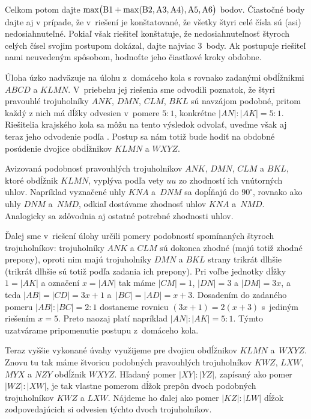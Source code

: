 {\smallskip\noindent
Celkom potom dajte
$\rm\max\bigl(B1+\max(B2,A3,A4),A5,A6\bigr)$ bodov.
Čiastočné body dajte aj v prípade, že v~riešení je
konštatované, že všetky štyri celé čísla sú (asi)
nedosiahnuteľné. Pokiaľ však riešiteľ konštatuje, že
nedosiahnuteľnosť štyroch celých čísel svojim postupom dokázal,
dajte najviac 3~body. Ak postupuje riešiteľ nami neuvedeným
spôsobom, hodnoťte jeho čiastkové kroky obdobne.
\endschema
}

{%
Úloha úzko nadväzuje na úlohu z~domáceho kola s rovnako zadanými
obdĺžnikmi $ABCD$ a $KLMN$. V~priebehu jej riešenia sme odvodili
poznatok, že štyri pravouhlé trojuholníky $ANK$, $DMN$, $CLM$, $BKL$
sú navzájom podobné, pritom každý z nich
má dĺžky odvesien v~pomere $5:1$,
konkrétne $|AN|:|AK|=5:1$. Riešitelia krajského kola sa môžu
na tento výsledok odvolať, uveďme však
aj teraz jeho odvodenie podľa \obr{}. Postup sa nám
totiž bude hodiť na obdobné posúdenie dvojice obdĺžnikov
$KLMN$ a $WXYZ$.
%

Avizovaná podobnosť pravouhlých trojuholníkov $ANK$, $DMN$, $CLM$ a $BKL$,
ktoré  obdĺžnik $KLMN$, vyplýva podľa vety $uu$
zo zhodností ich vnútorných uhlov. Napríklad vyznačené
uhly $KNA$ a~$DNM$ sa dopĺňajú do $90^{\circ}$, rovnako ako uhly
$DNM$ a~$NMD$, odkiaľ dostávame zhodnosť uhlov $KNA$ a~$NMD$.
Analogicky sa zdôvodnia aj ostatné potrebné zhodnosti uhlov.

Ďalej sme v~riešení úlohy určili pomery podobností
spomínaných štyroch trojuholníkov: trojuholníky $ANK$ a $CLM$ sú dokonca zhodné
(majú totiž zhodné prepony), oproti nim majú trojuholníky $DMN$ a $BKL$
strany trikrát dlhšie (trikrát dlhšie sú totiž podľa zadania
ich prepony). Pri voľbe jednotky dĺžky $1=|AK|$ a označení
$x=|AN|$ tak máme $|CM|=1$, $|DN|=3$ a $|DM|=3x$, a teda
$|AB|=|CD|=3x+1$ a~$|BC|=|AD|=x+3$. Dosadením do zadaného
pomeru $|AB|:|BC|=2:1$ dostaneme rovnicu $(3x+1)=2(x+3)$
s~jediným riešením $x=5$. Preto naozaj platí napríklad
$|AN|:|AK|=5:1$. Týmto uzatvárame pripomenutie
postupu z~domáceho kola.

Teraz vyššie vykonané úvahy využijeme pre dvojicu obdĺžnikov
$KLMN$ a~$WXYZ$. Znovu tu tak máme štvoricu
podobných pravouhlých trojuholníkov $KWZ$, $LXW$, $MYX$ a $NZY$
 obdĺžnik $WXYZ$. Hľadaný pomer $|XY|:|YZ|$,
zapísaný ako pomer $|WZ|:|XW|$, je tak vlastne pomerom
dĺžok prepôn dvoch podobných trojuholníkov $KWZ$ a $LXW$.
Nájdeme ho ďalej ako pomer $|KZ|:|LW|$
dĺžok zodpovedajúcich si odvesien týchto dvoch trojuholníkov.
%

}

